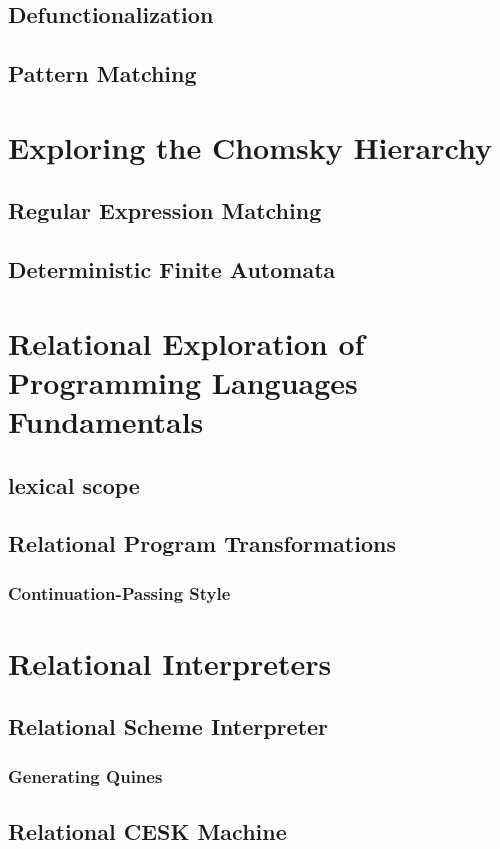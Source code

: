\documentclass[11pt]{book}
\begin{document}
\begin{schemeregion}
\section{Defunctionalization}
\section{Pattern Matching}

\chapter{Exploring the Chomsky Hierarchy}
\section{Regular Expression Matching}
\section{Deterministic Finite Automata}

\chapter{Relational Exploration of Programming Languages Fundamentals}
\section{lexical scope}
\section{Relational Program Transformations}
\subsection{Continuation-Passing Style}

\chapter{Relational Interpreters}
\section{Relational Scheme Interpreter}
\subsection{Generating Quines}
\section{Relational CESK Machine}

\end{schemeregion}
\end{document}
